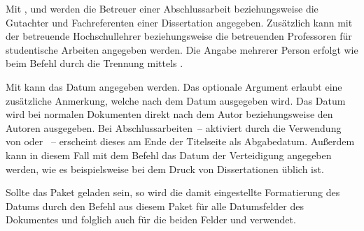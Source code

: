 \begin{Declaration}{}
\begin{Declaration}{}
\begin{Declaration}{}
\begin{Declaration}{}
\printdeclarationlist%
%
%
%
Mit ,  und  werden die Betreuer 
einer Abschlussarbeit beziehungsweise die Gutachter und Fachreferenten einer 
Dissertation angegeben. Zusätzlich kann mit  der betreuende 
Hochschullehrer beziehungsweise die betreuenden Professoren für studentische 
Arbeiten angegeben werden. Die Angabe mehrerer Person erfolgt wie beim Befehl 
 durch die Trennung mittels .
\end{Declaration}
\end{Declaration}
\end{Declaration}
\end{Declaration}

\begin{Declaration}{}
\begin{Declaration}{}
\printdeclarationlist%
%
%
Mit  kann das Datum angegeben werden. Das optionale Argument 
erlaubt eine zusätzliche Anmerkung, welche nach dem Datum ausgegeben wird. Das 
Datum wird bei normalen Dokumenten direkt nach dem Autor beziehungsweise den 
Autoren ausgegeben. Bei Abschlussarbeiten~-- aktiviert durch die Verwendung von 
 oder ~-- erscheint dieses am Ende der 
Titelseite als Abgabedatum. Außerdem kann in diesem Fall mit  dem Befehl
 das Datum der Verteidigung angegeben werden, wie es 
beispielsweise bei dem Druck von Dissertationen üblich ist.

Sollte das Paket  geladen sein, so wird die damit eingestellte 
Formatierung des Datums durch den Befehl  aus diesem Paket für 
alle Datumsfelder des Dokumentes und folglich auch für die beiden Felder 
 und  verwendet.
\end{Declaration}
\end{Declaration}

